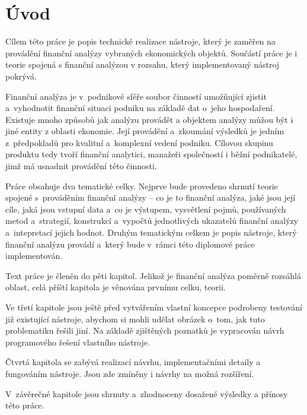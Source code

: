 \chapter{Úvod}
Cílem této práce je popis technické realizace nástroje, který je zaměřen na provádění finanční analýzy vybraných ekonomických objektů. Součástí práce je i teorie spojená s finanční analýzou v rozsahu, který implementovaný nástroj pokrývá.

Finanční analýza je v~podnikové sféře soubor činností umožňující zjistit a~vyhodnotit finanční situaci podniku na základě dat o~jeho hospodaření. Existuje mnoho způsobů jak analýzu provádět a objektem analýzy můžou být i jiné entity z oblasti ekonomie. Její provádění a~zkoumání výsledků je jedním z~předpokladů pro kvalitní a~komplexní vedení podniku. Cílovou skupinu produktu tedy tvoří finanční analytici, manažeři společností i běžní podnikatelé, jimž má usnadnit provádění této činnosti.

Práce obsahuje dva tematické celky. Nejprve bude provedeno shrnutí teorie spojené s~prováděním finanční analýzy -- co je to finanční analýza, jaké jsou její cíle, jaká jsou vstupní data a~co je výstupem, vysvětlení pojmů, používaných metod a~strategií, konstrukcí a~vypočtů jednotlivých ukazatelů finanční analýzy a~intepretací jejich hodnot. Druhým tematickým celkem je popis nástroje, který finanční analýzu provádí a~který bude v~rámci této diplomové práce implementován. 

Text práce je členěn do pěti kapitol. Jelikož je finanční analýza poměrně rozsáhlá oblast, celá příští kapitola je věnována prvnímu celku, teorii. 

Ve třetí kapitole jsou ještě před vytvářením vlastní koncepce podrobeny testování již existující nástroje, abychom si mohli udělat obrázek o~tom, jak tuto problematiku řešili jiní. Na základě zjištěných poznatků je vypracován návrh programového řešení vlastního nástroje.

Čtvrtá kapitola se zabývá realizací návrhu, implementačními detaily a fungováním nástroje. Jsou zde zmíněny i návrhy na možná rozšíření.

V~závěrečné kapitole jsou shrnuty a~zhodnoceny dosažené výsledky a přínosy této práce.





























